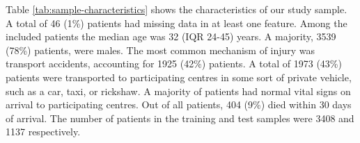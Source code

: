 \documentclass[10pt,letterpaper]{article}\usepackage[]{graphicx}\usepackage[]{color}
\begin{document}
Table \ref{tab:sample-characteristics} shows the characteristics of our study
sample. A total of 46 (1\%) patients had
missing data in at least one feature. Among the included patients the median age
was 32 (IQR 24-45) years. A majority, 3539 (78\%)
patients, were males. The most common mechanism of injury was transport
accidents, accounting for 1925 (42\%)
patients. A total of 1973 (43\%) patients were
transported to participating centres in some sort of private vehicle, such as a
car, taxi, or rickshaw. A majority of patients had normal vital signs on arrival
to participating centres. Out of all patients, 404 (9\%)
died within 30 days of arrival. The number of patients in the training and test
samples were 3408 and 1137
respectively.

\end{document}
